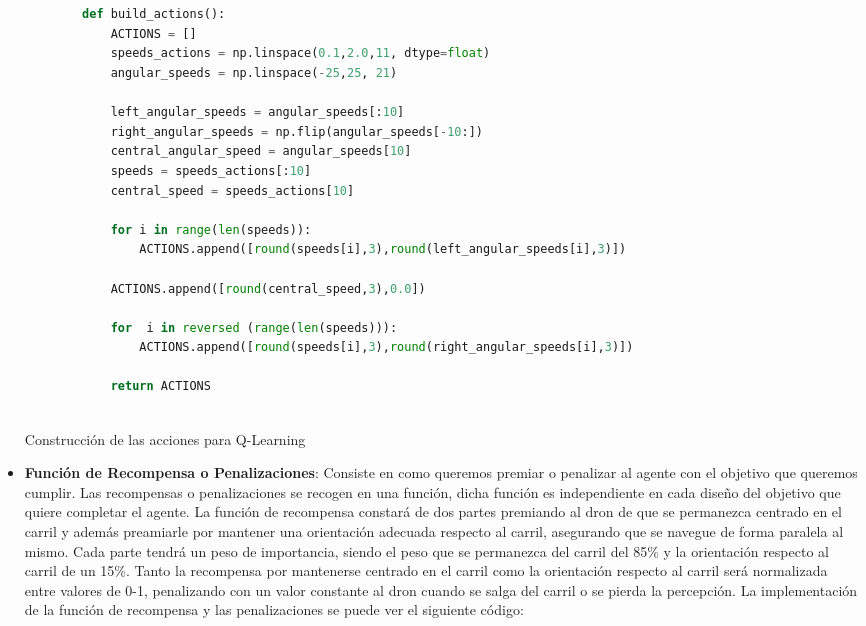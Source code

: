 \begin{itemize}
    \begin{code}[H]
      \begin{lstlisting}[language=Python]
  
        
        def build_actions():
            ACTIONS = []
            speeds_actions = np.linspace(0.1,2.0,11, dtype=float)
            angular_speeds = np.linspace(-25,25, 21)
        
            left_angular_speeds = angular_speeds[:10]
            right_angular_speeds = np.flip(angular_speeds[-10:])
            central_angular_speed = angular_speeds[10]
            speeds = speeds_actions[:10]
            central_speed = speeds_actions[10]
        
            for i in range(len(speeds)):
                ACTIONS.append([round(speeds[i],3),round(left_angular_speeds[i],3)])
        
            ACTIONS.append([round(central_speed,3),0.0])
        
            for  i in reversed (range(len(speeds))):
                ACTIONS.append([round(speeds[i],3),round(right_angular_speeds[i],3)])
  
            return ACTIONS
       
      \end{lstlisting}
      \caption[Construcción de las acciones para Q-Learning]{Construcción de las acciones para Q-Learning}
      \label{cod:codejemplo}
      \end{code}
      
    \item \textbf{Función de Recompensa o Penalizaciones}: Consiste en como queremos premiar o penalizar al agente con el objetivo que queremos cumplir. Las recompensas o penalizaciones se recogen
    en una función, dicha función es independiente en cada diseño del objetivo que quiere completar el agente. La función de recompensa constará de dos partes premiando al dron de que se 
    permanezca centrado en el carril y además preamiarle por mantener una orientación adecuada respecto al carril, asegurando que se navegue de forma paralela al mismo. Cada parte tendrá un peso
    de importancia, siendo el peso que se permanezca del carril del 85\% y la orientación respecto al carril de un 15\%. Tanto la recompensa por mantenerse centrado en el carril 
    como la orientación respecto al carril será normalizada entre valores de 0-1, penalizando con un valor constante al dron cuando se salga del carril o 
    se pierda la percepción. La implementación de la función de recompensa y las penalizaciones se puede ver el siguiente código:


\end{itemize}
